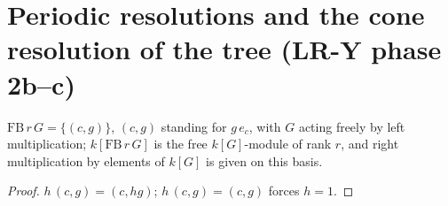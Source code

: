 \section{Periodic resolutions and the cone resolution of the tree (LR-Y phase 2b--c)}

\begin{definition}\label{def:mp-fb}
  \leanok
  $\mathrm{FB}\,r\,G=\{(c,g)\}$, $(c,g)$ standing for $g\,e_c$, with $G$ acting freely by left multiplication; $k[\mathrm{FB}\,r\,G]$ is
  the free $k[G]$-module of rank $r$, and right multiplication by elements of $k[G]$ is given on this basis.
\end{definition}
\begin{proof}
  \leanok
  $h\,(c,g)=(c,hg)$; $h\,(c,g)=(c,g)$ forces $h=1$.
\end{proof}

